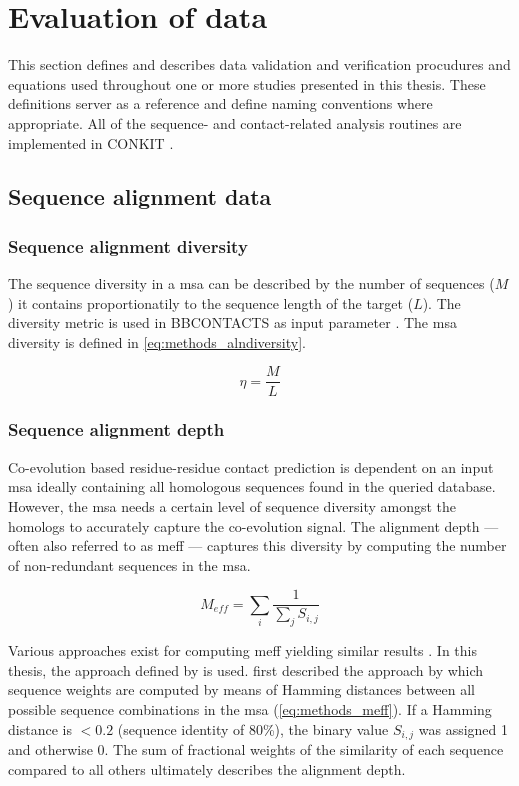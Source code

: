 \section{Evaluation of data}
This section defines and describes data validation and verification procudures and equations used throughout one or more studies presented in this thesis. These definitions server as a reference and define naming conventions where appropriate. All of the sequence- and contact-related analysis routines are implemented in CONKIT \cite{Simkovic2017-us}.

\subsection{Sequence alignment data}
\subsubsection{Sequence alignment diversity}
The sequence diversity in a \gls{msa} can be described by the number of sequences ($M$) it contains proportionatily to the sequence length of the target ($L$). The diversity metric is used in BBCONTACTS as input parameter \cite{Andreani2015-qn}. The \gls{msa} diversity \texteta is defined in \cref{eq:methods_alndiversity}.

\begin{equation}
    \eta=\frac{M}{L}
    \label{eq:methods_alndiversity}
\end{equation}

\subsubsection{Sequence alignment depth}
Co-evolution based residue-residue contact prediction is dependent on an input \gls{msa} ideally containing all homologous sequences found in the queried database. However, the \gls{msa} needs a certain level of sequence diversity amongst the homologs to accurately capture the co-evolution signal. The alignment depth --- often also referred to as \gls{meff} --- captures this diversity by computing the number of non-redundant sequences in the \gls{msa}.

\begin{equation}
    M_{eff}=\sum_{i}\frac{1}{\sum_{j}S_{i,j}}
    \label{eq:methods_meff}
\end{equation}

Various approaches exist for computing \gls{meff} \cite{Morcos2011-lk,Jones2012-ks,Jones2015-vq} yielding similar results \cite{Skwark2014-qp}. In this thesis, the approach defined by \textcite{Morcos2011-lk} is used. \textcite{Morcos2011-lk} first described the approach by which sequence weights are computed by means of Hamming distances between all possible sequence combinations in the \gls{msa} (\cref{eq:methods_meff}). If a Hamming distance is $<0.2$ (sequence identity of 80\%), the binary value $S_{i,j}$ was assigned 1 and otherwise 0. The sum of fractional weights of the similarity of each sequence compared to all others ultimately describes the alignment depth.

